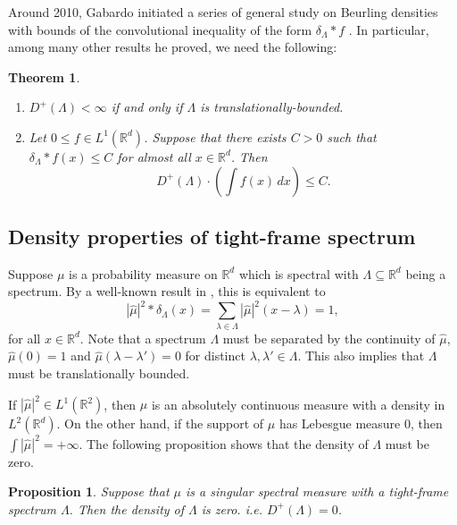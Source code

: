 \documentclass[12pt,a4paper,oneside]{amsart}
\newtheorem{theorem}{Theorem}
\newtheorem{proposition}{Proposition}
\theoremstyle{definition}
\newcommand{\Abs}[1]{{\left|{#1}\right|}}
\newcommand{\RR}{{\mathbb R}}
\newcommand{\ft}[1]{\widehat{#1}}
\newcounter{rem}
\begin{document}
Around 2010, Gabardo initiated a series of general study on Beurling densities with bounds of the convolutional inequality of the form $\delta_{\Lambda}\ast f$ \cite{Gab12,Gab13}. In particular, among many other results {he proved}, we need the following:


\begin{theorem} \label{Th-Gab} \cite[Proposition 3, Theorem 1 and Corollary 3]{Gab13}
\begin{enumerate}
\item  $D^{+}(\Lambda)<\infty$ if and only if $\Lambda$ is translationally-bounded. 
\item  Let ${0 \le }f\in L^1(\RR^d)$.  Suppose that there exists $C>0$ such that $\delta_{\Lambda}\ast f(x) \le C$ for almost all $x\in \RR^d$. Then 
$$
D^{+}(\Lambda) \cdot \left(\int {f(x)}\,dx\right) \le C. 
$$
\end{enumerate}
\end{theorem}






\subsection{Density properties of tight-frame spectrum}   Suppose $\mu$ is a probability measure on $\RR^d$ which is spectral with $\Lambda \subseteq \RR^d$ being a spectrum. By a well-known result in \cite{jorgensen1998dense}, {this is equivalent to}
\begin{equation}\label{spectrum-as-tiling}
|\ft\mu|^2\ast \delta_{\Lambda} (x) = \sum_{\lambda\in\Lambda}\Abs{\ft{\mu}}^2(x-\lambda) = 1,
\end{equation}
for all $x \in \RR^d$. Note that a spectrum $\Lambda$ must be separated by the continuity of $\ft{\mu}$, $\ft{\mu}(0) = 1$ and  $\widehat{\mu}(\lambda-\lambda') = 0$ for distinct $\lambda,\lambda'\in\Lambda$. This also implies that $\Lambda$ must be translationally bounded. 


If $\Abs{\ft\mu}^2\in L^1(\RR^2)$,  then $\mu$ is an absolutely continuous measure with a density in $L^2(\RR^d)$. On the other hand, if the support of $\mu$ has Lebesgue measure 0, then $\int\Abs{\ft\mu}^2 = +\infty$. The following proposition shows that {the density of $\Lambda$} must be zero. 


\begin{proposition}\label{prop-Density}
    Suppose that $\mu$ is a singular spectral measure with a {tight-frame} spectrum $\Lambda$. Then the density of $\Lambda$ is zero. i.e. $D^{+}(\Lambda) = 0$. 
\end{proposition}
\end{document}
